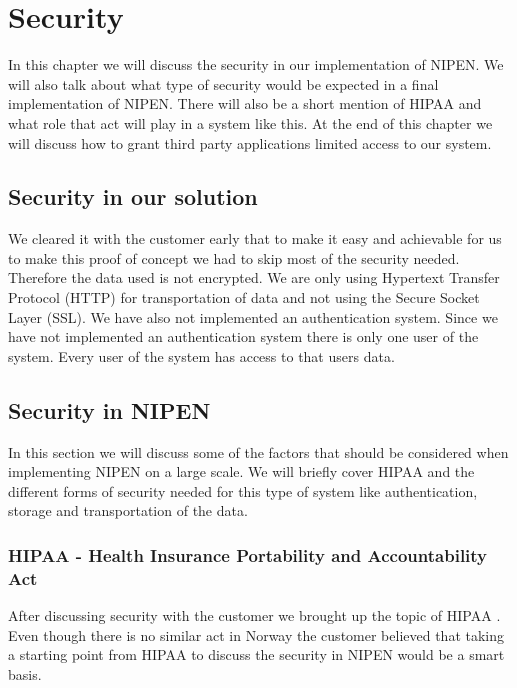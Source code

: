 \chapter{Security} 
\label{ch:security}


In this chapter we will discuss the security in our implementation of NIPEN.
We will also talk about what type of security would be expected in a final implementation of NIPEN. 
There will also be a short mention of HIPAA and what role that act will play in a system like this.
At the end of this chapter we will discuss how to grant third party applications limited access to our system.

\section{Security in our solution}
We cleared it with the customer early that to make it easy and achievable for us to make this proof of concept we had to skip most of the security needed.
Therefore the data used is not encrypted. 
We are only using Hypertext Transfer Protocol (HTTP) for transportation of data and not using the Secure Socket Layer (SSL).  
We have also not implemented an authentication system.
Since we have not implemented an authentication system there is only one user of the system.
Every user of the system has access to that users data.

\section{Security in NIPEN}

In this section we will discuss some of the factors that should be considered when implementing NIPEN on a large scale.
We will briefly cover HIPAA and the different forms of security needed for this type of system like authentication, storage and transportation of the data.


\subsection{HIPAA - Health Insurance Portability and Accountability Act}

After discussing security with the customer we brought up the topic of HIPAA \cite{HIPAA}. 
Even though there is no similar act in Norway the customer believed that taking a starting point from HIPAA to discuss the security in NIPEN would be a smart basis. 

